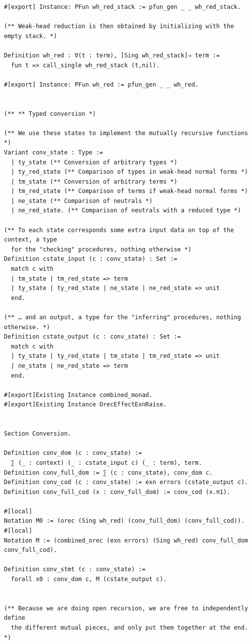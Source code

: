 \begin{lstlisting}
#[export] Instance: PFun wh_red_stack := pfun_gen _ _ wh_red_stack.

(** Weak-head reduction is then obtained by initializing with the empty stack. *)

Definition wh_red : ∇(t : term), [Sing wh_red_stack]⇒ term :=
  fun t => call_single wh_red_stack (t,nil).

#[export] Instance: PFun wh_red := pfun_gen _ _ wh_red.


(** ** Typed conversion *)

(** We use these states to implement the mutually recursive functions *)
Variant conv_state : Type :=
  | ty_state (** Conversion of arbitrary types *)
  | ty_red_state (** Comparison of types in weak-head normal forms *)
  | tm_state (** Conversion of arbitrary terms *)
  | tm_red_state (** Comparison of terms if weak-head normal forms *)
  | ne_state (** Comparison of neutrals *)
  | ne_red_state. (** Comparison of neutrals with a reduced type *)

(** To each state corresponds some extra input data on top of the context, a type
  for the "checking" procedures, nothing otherwise *)
Definition cstate_input (c : conv_state) : Set :=
  match c with
  | tm_state | tm_red_state => term
  | ty_state | ty_red_state | ne_state | ne_red_state => unit
  end.

(** … and an output, a type for the "inferring" procedures, nothing otherwise. *)
Definition cstate_output (c : conv_state) : Set :=
  match c with
  | ty_state | ty_red_state | tm_state | tm_red_state => unit
  | ne_state | ne_red_state => term
  end.

#[export]Existing Instance combined_monad.
#[export]Existing Instance OrecEffectExnRaise.


Section Conversion.

Definition conv_dom (c : conv_state) :=
  ∑ (_ : context) (_ : cstate_input c) (_ : term), term.
Definition conv_full_dom := ∑ (c : conv_state), conv_dom c.
Definition conv_cod (c : conv_state) := exn errors (cstate_output c).
Definition conv_full_cod (x : conv_full_dom) := conv_cod (x.π1).

#[local]
Notation M0 := (orec (Sing wh_red) (conv_full_dom) (conv_full_cod)).
#[local]
Notation M := (combined_orec (exn errors) (Sing wh_red) conv_full_dom conv_full_cod).

Definition conv_stmt (c : conv_state) :=
  forall x0 : conv_dom c, M (cstate_output c).


(** Because we are doing open recursion, we are free to independently define
  the different mutual pieces, and only put them together at the end. *)


\end{lstlisting}
